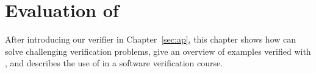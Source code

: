 \chapter{Evaluation of \AutoProof}
\label{sec:eval}

After introducing our verifier \AutoProof in Chapter~\ref{sec:ap}, this chapter shows how \AutoProof can solve challenging verification problems, give an overview of examples verified with \AutoProof, and describes the use of \AutoProof in a software verification course.

